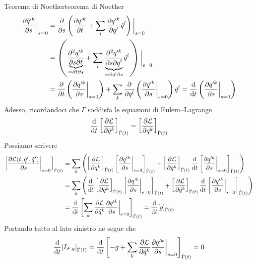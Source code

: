 \documentclass[openany]{book}
\begin{document}
\begin{theorem}{Teorema di Noether}{teorema di Noether}
    \begin{align*}
        \frac{\partial \dot q'^k}{\partial s} \bigg|_{s=0} & = \frac{\partial }{\partial s}\left( \frac{\partial q'^k}{\partial t} + \sum_l \frac{\partial q'^k}{\partial q^l}\dot q^l \right)\bigg|_{s=0} \\ & = \left( \frac{\partial^2 q'^k }{\underbrace{\partial s \partial t}_{= \partial t \partial s}} + \sum_l \frac{\partial^2 q'^k}{\underbrace{\partial s \partial q^l}_{= \partial q^l \partial s}} \dot q^l \right)\bigg|_{s=0} \\ & = \frac{\partial }{\partial t}\left( \frac{\partial q'^k}{\partial s} \bigg|_{s=0} \right) + \sum_k \frac{\partial}{\partial q^l} \left( \frac{\partial q'^k}{\partial s}\bigg|_{s=0} \right)\dot q^l = \frac{\text{d}}{\text{d} t}\left( \frac{\partial q'^k}{\partial s}\bigg|_{s=0} \right)
    \end{align*}
    Adesso, ricordandoci che $\Gamma$ soddisfa le equazioni di Eulero--Lagrange 
    \[ \frac{\text{d}}{\text{d} t}\left[ \frac{\partial \mathcal{L}}{\partial \dot q^k} \right]_{\hat\Gamma(t)} =  \left[ \frac{\partial \mathcal{L}}{\partial q^k} \right]_{\hat\Gamma(t)} \]
    Possiamo scrivere 
    \begin{align*}
        \left[ \frac{\partial \mathcal{L}(t,q',\dot q')}{\partial s}\bigg|_{s=0} \right]_{\hat\Gamma(t)} & = \sum_k \left( \left[ \frac{\partial \mathcal{L}}{\partial q^k} \right]_{\hat\Gamma(t)}\left[ \frac{\partial q'^k}{\partial s}\bigg|_{s=0} \right]_{\hat\Gamma(t)} + \left[ \frac{\partial \mathcal{L}}{\partial \dot q^k} \right]_{\hat\Gamma(t)}\frac{\text{d}}{\text{d} t} \left[ \frac{\partial q'^k}{\partial s}\bigg|_{s=0} \right]_{\hat\Gamma(t)} \right) \\
        & = \sum_k \left( \frac{\text{d}}{\text{d} t}\left[ \frac{\partial \mathcal{L}}{\partial \dot q^k} \right]_{\hat\Gamma(t)}\left[ \frac{\partial q'^k}{\partial s}\bigg|_{s=0} \right]_{\hat\Gamma(t)} + \left[ \frac{\partial \mathcal{L}}{\partial \dot q^k} \right]_{\hat\Gamma(t)}\frac{\text{d}}{\text{d} t} \left[ \frac{\partial q'^k}{\partial s}\bigg|_{s=0} \right]_{\hat\Gamma(t)} \right) \\ 
        & = \frac{\text{d}}{\text{d} t}\left[ \sum_k \frac{\partial \mathcal{L}}{\partial\dot q^k} \frac{\partial q'^k}{\partial s}\bigg|_{s=0} \right]_{\hat\Gamma(t)} = \frac{\text{d}}{\text{d} t}[g]_{\hat\Gamma(t)}
    \end{align*}
    Portando tutto al lato sinistro ne segue che 
    \[ \frac{\text{d}}{\text{d} t} [I_{F,g}]_{\hat\Gamma(t)} = \frac{\text{d}}{\text{d} t}\left[ -g + \sum_k \frac{\partial \mathcal{L}}{\partial \dot q^k}\frac{\partial q'^k}{\partial s}\bigg|_{s=0} \right]_{\hat\Gamma(t)} = 0 \]

\end{theorem}
\end{document}
